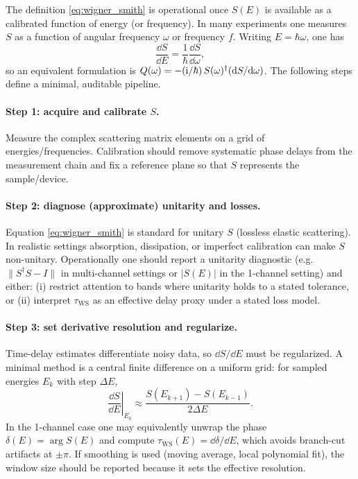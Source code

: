 The definition \eqref{eq:wigner_smith} is operational once $S(E)$ is available as a calibrated function of energy (or frequency).
In many experiments one measures $S$ as a function of angular frequency $\omega$ or frequency $f$.
Writing $E=\hbar\omega$, one has
\[
\frac{\dd S}{\dd E}=\frac{1}{\hbar}\frac{\dd S}{\dd \omega},
\]
so an equivalent formulation is $Q(\omega)=-(\mathrm{i}/\hbar)\,S(\omega)^\dagger(\mathrm{d} S/\mathrm{d}\omega)$.
The following steps define a minimal, auditable pipeline.

\paragraph{Step 1: acquire and calibrate \texorpdfstring{$S$}{S}.}
Measure the complex scattering matrix elements on a grid of energies/frequencies.
Calibration should remove systematic phase delays from the measurement chain and fix a reference plane so that $S$ represents the sample/device.

\paragraph{Step 2: diagnose (approximate) unitarity and losses.}
Equation \eqref{eq:wigner_smith} is standard for unitary $S$ (lossless elastic scattering).
In realistic settings absorption, dissipation, or imperfect calibration can make $S$ non-unitary.
Operationally one should report a unitarity diagnostic (e.g.\ $\|S^\dagger S-I\|$ in multi-channel settings or $|S(E)|$ in the 1-channel setting) and either:
(i) restrict attention to bands where unitarity holds to a stated tolerance, or
(ii) interpret $\tau_{\mathrm{WS}}$ as an effective delay proxy under a stated loss model.

\paragraph{Step 3: set derivative resolution and regularize.}
Time-delay estimates differentiate noisy data, so $\dd S/\dd E$ must be regularized.
A minimal method is a central finite difference on a uniform grid:
for sampled energies $E_k$ with step $\Delta E$,
\[
\left.\frac{\dd S}{\dd E}\right|_{E_k}\approx \frac{S(E_{k+1})-S(E_{k-1})}{2\Delta E}.
\]
In the 1-channel case one may equivalently unwrap the phase $\delta(E)=\arg S(E)$ and compute $\tau_{\mathrm{WS}}(E)=\dd\delta/\dd E$, which avoids branch-cut artifacts at $\pm\pi$.
If smoothing is used (moving average, local polynomial fit), the window size should be reported because it sets the effective resolution.

